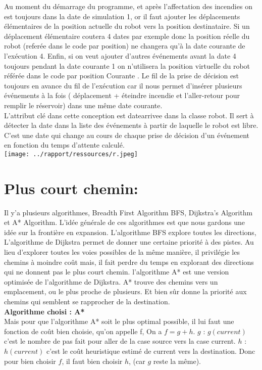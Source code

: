 \documentclass[french, 11pt]{article}
\begin{document}
	Au moment du démarrage du programme, et après l'affectation des incendies on est toujours dans la date de simulation 1, or il faut ajouter les déplacements élémentaires de la position actuelle du robot vers la position destinataire. Si un déplacement élémentaire coutera 4 dates par exemple donc la position réelle du robot (referée dans le code par position) ne changera qu'à la date courante de l'exécution 4. Enfin, si on veut ajouter d'autres événements avant la date 4 toujours pendant la date courante 1 on n'utilisera la position virtuelle du robot référée dans le code par position Courante . Le fil de la prise de décision est toujours en avance du fil de l'exécution car il nous permet d'insérer plusieurs événements à la fois ( déplacement + éteindre incendie et l'aller-retour pour remplir le réservoir) dans une même date courante.\\

	L'attribut clé dans cette conception est datearrivee dans la classe robot. Il sert à détecter la date dans la liste des événements à partir de laquelle le robot est libre. C'est une date qui change au cours de chaque prise de décision d'un événement en fonction du temps d'attente calculé.\\
	
\texttt{[image: ../rapport/ressources/r.jpeg]}
	
\section*{Plus court chemin:}	
	Il y’a plusieurs algorithmes, Breadth First Algorithm BFS, Dijkstra's Algorithm et A* Algorithm. L’idée générale de ces algorithmes est que nous gardons une idée sur la frontière en expansion. L’algorithme BFS explore toutes les directions, L’algorithme de Dijkstra permet de donner une certaine priorité à des pistes. Au lieu d’explorer toutes les voies possibles de la même manière, il privilégie les chemins à moindre coût mais, il fait perdre du temps en explorant des directions qui ne
donnent pas le plus court chemin. l’algorithme A* est une version optimisée de l’algorithme de Dijkstra. A* trouve des chemins vers un emplacement, ou le plus proche de plusieurs. Et bien sûr donne la priorité aux chemins qui semblent se rapprocher de la destination. \\

\textbf{Algorithme choisi : A*} \\
	Mais pour que l’algorithme A* soit le plus optimal possible, il lui faut une fonction de coût bien
choisie, qu’on appelle f, On a $f = g + h$.
$g$ : $g(current)$ c’est le nombre de pas fait pour aller de la case source vers la case current.
$h$ : $h(current)$ c’est le coût heuristique estimé de current vers la destination.
Donc pour bien choisir $f$, il faut bien choisir $h$, (car $g$ reste la même). \\
\end{document}
